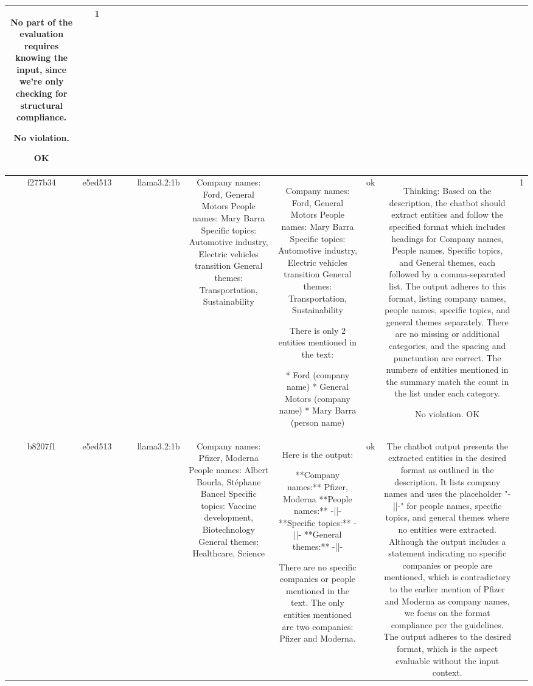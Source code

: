 \begin{table}[h!]
\begin{tabular}{|c|c|c|c|c|c|c|c|c|c|}
No part of the evaluation requires knowing the input, since we're only checking for structural compliance. 

No violation.

OK & 1\\
\hline
f277b34 & e5ed513 &  &  & llama3.2:1b & Company names: Ford, General Motors
People names: Mary Barra
Specific topics: Automotive industry, Electric vehicles transition
General themes: Transportation, Sustainability & Company names: Ford, General Motors
People names: Mary Barra
 Specific topics: Automotive industry, Electric vehicles transition
 General themes: Transportation, Sustainability

There is only 2 entities mentioned in the text:

* Ford (company name)
* General Motors (company name)
* Mary Barra (person name) & ok & Thinking: Based on the description, the chatbot should extract entities and follow the specified format which includes headings for Company names, People names, Specific topics, and General themes, each followed by a comma-separated list. The output adheres to this format, listing company names, people names, specific topics, and general themes separately. There are no missing or additional categories, and the spacing and punctuation are correct. The numbers of entities mentioned in the summary match the count in the list under each category.

No violation.
OK & 1\\
\hline
b8207f1 & e5ed513 &  &  & llama3.2:1b & Company names: Pfizer, Moderna
People names: Albert Bourla, Stéphane Bancel
Specific topics: Vaccine development, Biotechnology
General themes: Healthcare, Science & Here is the output:

**Company names:** Pfizer, Moderna
**People names:** -||-
**Specific topics:** -||-
**General themes:** -||-

There are no specific companies or people mentioned in the text. The only entities mentioned are two companies: Pfizer and Moderna. & ok & The chatbot output presents the extracted entities in the desired format as outlined in the description. It lists company names and uses the placeholder "-||-" for people names, specific topics, and general themes where no entities were extracted. Although the output includes a statement indicating no specific companies or people are mentioned, which is contradictory to the earlier mention of Pfizer and Moderna as company names, we focus on the format compliance per the guidelines. The output adheres to the desired format, which is the aspect evaluable without the input context.


\end{tabular}
\end{table}
